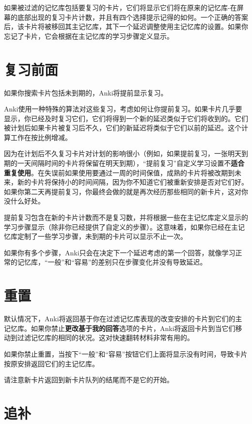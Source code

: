 \documentclass[a4paper]{book}
\begin{document}
		如果被过滤的记忆库包括要复习的卡片，它们将显示它们将在原来的记忆库-在屏幕的底部出现的复习卡片计数，并且有四个选择提示记得的如何。一个正确的答案后，该卡片将被移回其主记忆库，其下一个延迟调整使用主记忆库的设置。如果你忘记了卡片，它会根据在主记忆库的学习步骤定义显示。
		
		\section{复习前面}
		
		如果你搜索卡片包括未到期的，Anki将提前显示复习。
		
		Anki使用一种特殊的算法对这些复习，考虑如何让你提前复习。如果卡片几乎要显示，你已经及时复习它们，它们将得到一个新的延迟类似于它们将收到的。它们被计划后如果卡片被复习后不久，它们的新延迟将类似于它们以前的延迟。这个计算工作在按比例增减。
		
		
		\begin{shaded}
			因为在计划后不久复习卡片对计划的影响很小（例如，如果提前复习，一张明天到期的一天间隔时间的卡片将保留在明天到期），“提前复习”自定义学习设置不\textbf{适合重复使用}。在失误前如果使用要通过一周的时间保值，成熟的卡片将被改期到未来，新的卡片将保持小的时间间隔，因为你不知道它们被重新安排是否对它们好。如果你第二天再提前复习，你最终会做的就是再次经历那些相同的新卡片，这对你没什么好处。
		\end{shaded}
		
		提前复习包含在新的卡片计数而不是复习数，并将根据一些在主记忆库定义显示的学习步骤显示（除非你已经提供了自定义的步骤）。这意味着，如果你已经在主记忆库定制了一些学习步骤，未到期的卡片可以显示不止一次。
		
		如果你有多个步骤，Anki只会在决定下一个延迟考虑的第一个回答，就像学习正常的记忆库，“一般”和“容易”的差别只在步骤变化并没有导致延迟。
		
		\section{重置}
		
		默认情况下，Anki将返回基于你在过滤记忆库表现的改变安排的卡片到它们的主记忆库。如果你禁止\textbf{更改基于我的回答}选项的卡片，Anki将返回卡片到当它们移动到过滤记忆库的相同的状况。这对快速翻转材料非常有用的。
		
		如果你禁止重置，当按下“一般”和“容易”按钮它们上面将显示没有时间，导致卡片按原安排返回它们的主记忆库。
		
		请注意新卡片返回到新卡片队列的结尾而不是它的开始。
		
		\section{追补}
		
\end{document}
